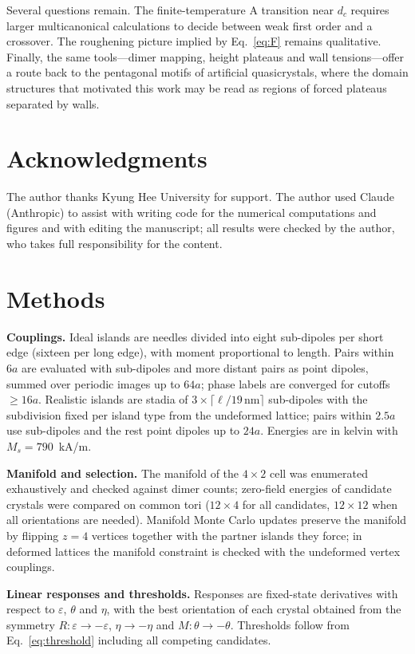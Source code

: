 \documentclass[10pt,twoside]{article}
\begin{document}
Several questions remain. The finite-temperature A transition near $d_c$ requires larger multicanonical calculations to decide between weak first order and a crossover. The roughening picture implied by Eq.~\eqref{eq:F} remains qualitative. Finally, the same tools---dimer mapping, height plateaus and wall tensions---offer a route back to the pentagonal motifs of artificial quasicrystals, where the domain structures that motivated this work may be read as regions of forced plateaus separated by walls.

\section*{Acknowledgments}
The author thanks Kyung Hee University for support. The author used Claude (Anthropic) to assist with writing code for the numerical computations and figures and with editing the manuscript; all results were checked by the author, who takes full responsibility for the content.

\appendix
\section{Methods}
\label{app:methods}

\textbf{Couplings.} Ideal islands are needles divided into eight sub-dipoles per short edge (sixteen per long edge), with moment proportional to length. Pairs within $6a$ are evaluated with sub-dipoles and more distant pairs as point dipoles, summed over periodic images up to $64a$; phase labels are converged for cutoffs $\geq16a$. Realistic islands are stadia of $3\times\lceil\ell/19\,\text{nm}\rceil$ sub-dipoles with the subdivision fixed per island type from the undeformed lattice; pairs within $2.5a$ use sub-dipoles and the rest point dipoles up to $24a$. Energies are in kelvin with $M_s=790$~kA/m.

\textbf{Manifold and selection.} The manifold of the $4\times2$ cell was enumerated exhaustively and checked against dimer counts; zero-field energies of candidate crystals were compared on common tori ($12\times4$ for all candidates, $12\times12$ when all orientations are needed). Manifold Monte Carlo updates preserve the manifold by flipping $z=4$ vertices together with the partner islands they force; in deformed lattices the manifold constraint is checked with the undeformed vertex couplings.

\textbf{Linear responses and thresholds.} Responses are fixed-state derivatives with respect to $\varepsilon$, $\theta$ and $\eta$, with the best orientation of each crystal obtained from the symmetry $R:\varepsilon\to-\varepsilon$, $\eta\to-\eta$ and $M:\theta\to-\theta$. Thresholds follow from Eq.~\eqref{eq:threshold} including all competing candidates.
\end{document}
